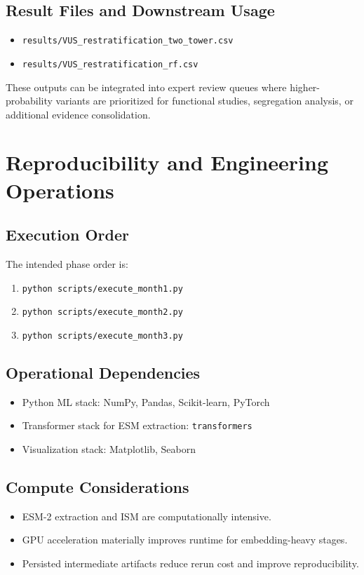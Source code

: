 \documentclass[11pt,a4paper]{article}
\begin{document}
\subsection{Result Files and Downstream Usage}
\begin{itemize}[leftmargin=1.2cm]
    \item \texttt{results/VUS\_restratification\_two\_tower.csv}
    \item \texttt{results/VUS\_restratification\_rf.csv}
\end{itemize}

These outputs can be integrated into expert review queues where higher-probability variants are prioritized for functional studies, segregation analysis, or additional evidence consolidation.

\section{Reproducibility and Engineering Operations}
\subsection{Execution Order}
The intended phase order is:
\begin{enumerate}[leftmargin=1.2cm]
    \item \texttt{python scripts/execute\_month1.py}
    \item \texttt{python scripts/execute\_month2.py}
    \item \texttt{python scripts/execute\_month3.py}
\end{enumerate}

\subsection{Operational Dependencies}
\begin{itemize}[leftmargin=1.2cm]
    \item Python ML stack: NumPy, Pandas, Scikit-learn, PyTorch
    \item Transformer stack for ESM extraction: \texttt{transformers}
    \item Visualization stack: Matplotlib, Seaborn
\end{itemize}

\subsection{Compute Considerations}
\begin{itemize}[leftmargin=1.2cm]
    \item ESM-2 extraction and ISM are computationally intensive.
    \item GPU acceleration materially improves runtime for embedding-heavy stages.
    \item Persisted intermediate artifacts reduce rerun cost and improve reproducibility.
\end{itemize}
\end{document}
